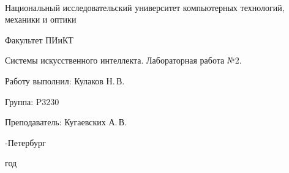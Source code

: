 \thispagestyle{empty}

\onecolumn
\begin{center}
	\
\vspace{1 cm}

\huge Национальный исследовательский университет компьютерных технологий, механики и оптики
\vspace{0.5cm}

\Huge Факультет ПИиКТ


\vspace{5cm}
\huge Системы искусственного интеллекта. Лабораторная работа №2.
\vspace{0.2cm}

\end{center}
\vspace{6 cm}

\begin{flushright}
\Large

Работу выполнил: Кулаков Н.\,В.
\smallskip

Группа: P3230
\smallskip

Преподаватель: Кугаевских А.\,В.
\smallskip

\vspace{4cm}
	
-Петербург

 год
\end{flushright}
